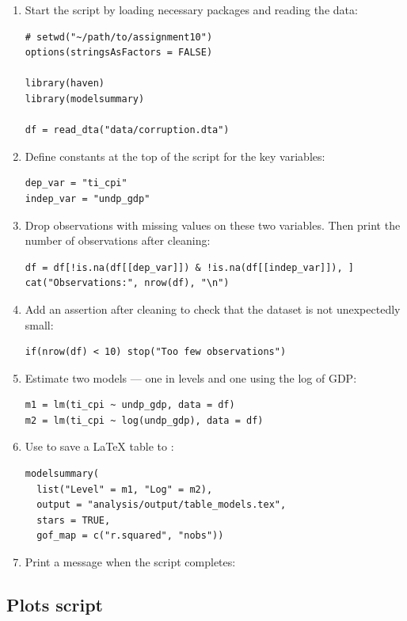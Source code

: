 \begin{enumerate}[label=\alph*)]
  \item Start the script by loading necessary packages and reading the data:
  \begin{lstlisting}
# setwd("~/path/to/assignment10")
options(stringsAsFactors = FALSE)

library(haven)
library(modelsummary)

df = read_dta("data/corruption.dta")
  \end{lstlisting}
  \item Define constants at the top of the script for the key variables:
  \begin{lstlisting}
dep_var = "ti_cpi"
indep_var = "undp_gdp"
  \end{lstlisting}
  \item Drop observations with missing values on these two variables. Then print the number of observations after cleaning:
  \begin{lstlisting}
df = df[!is.na(df[[dep_var]]) & !is.na(df[[indep_var]]), ]
cat("Observations:", nrow(df), "\n")
  \end{lstlisting}
  \item Add an assertion after cleaning to check that the dataset is not unexpectedly small:
  \begin{lstlisting}
if(nrow(df) < 10) stop("Too few observations")
  \end{lstlisting}
  \item Estimate two models --- one in levels and one using the log of GDP:
  \begin{lstlisting}
m1 = lm(ti_cpi ~ undp_gdp, data = df)
m2 = lm(ti_cpi ~ log(undp_gdp), data = df)
  \end{lstlisting}
  \item Use  to save a \LaTeX{} table to :
  \begin{lstlisting}
modelsummary(
  list("Level" = m1, "Log" = m2),
  output = "analysis/output/table_models.tex",
  stars = TRUE,
  gof_map = c("r.squared", "nobs"))
  \end{lstlisting}
  \item Print a message when the script completes: \\
\end{enumerate}

\subsection{Plots script}

